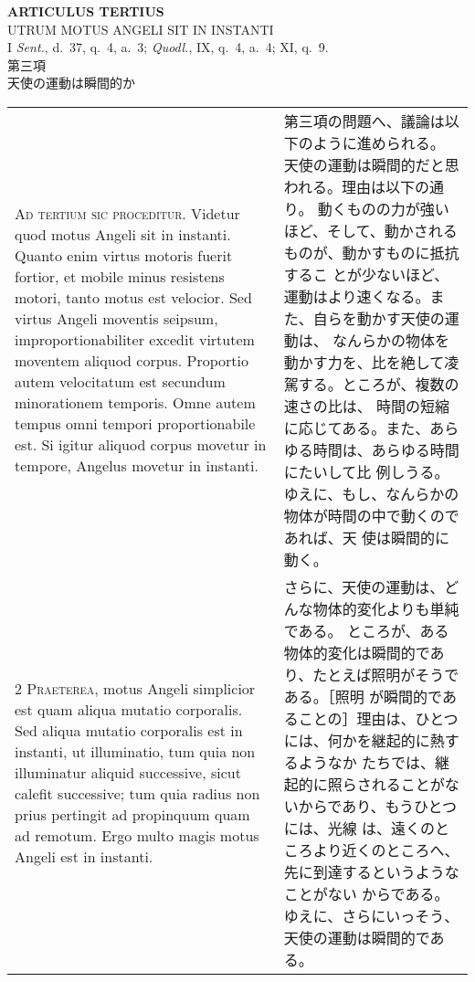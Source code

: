 \documentclass[10pt]{jsarticle} %
\begin{document}
\begin{center}
 {\Large {\bf ARTICULUS TERTIUS}}\\
 {\large UTRUM MOTUS ANGELI SIT IN INSTANTI}\\
 {\footnotesize I {\itshape Sent.}, d.~37, q.~4, a.~3; {\itshape
 Quodl.}, IX, q.~4, a.~4; XI, q.~9.}\\
 {\Large 第三項\\天使の運動は瞬間的か}
\end{center}

\begin{longtable}{p{21em}p{21em}}

{\huge A}{\scshape d tertium sic proceditur}. Videtur quod
motus Angeli sit in instanti. Quanto enim virtus motoris fuerit fortior,
et mobile minus resistens motori, tanto motus est velocior. Sed virtus
Angeli moventis seipsum, improportionabiliter excedit virtutem moventem
aliquod corpus. Proportio autem velocitatum est secundum minorationem
temporis. Omne autem tempus omni tempori proportionabile est. Si igitur
aliquod corpus movetur in tempore, Angelus movetur in instanti.

&


第三項の問題へ、議論は以下のように進められる。
天使の運動は瞬間的だと思われる。理由は以下の通り。
動くものの力が強いほど、そして、動かされるものが、動かすものに抵抗するこ
 とが少ないほど、運動はより速くなる。また、自らを動かす天使の運動は、
 なんらかの物体を動かす力を、比を絶して凌駕する。ところが、複数の速さの比は、
 時間の短縮に応じてある。また、あらゆる時間は、あらゆる時間にたいして比
 例しうる。ゆえに、もし、なんらかの物体が時間の中で動くのであれば、天
 使は瞬間的に動く。

\\


{\scshape 2 Praeterea}, motus Angeli simplicior est quam
aliqua mutatio corporalis. Sed aliqua mutatio corporalis est in
instanti, ut illuminatio, tum quia non illuminatur aliquid successive,
sicut calefit successive; tum quia radius non prius pertingit ad
propinquum quam ad remotum. Ergo multo magis motus Angeli est in
instanti.

&
さらに、天使の運動は、どんな物体的変化よりも単純である。
ところが、ある物体的変化は瞬間的であり、たとえば照明がそうである。［照明
 が瞬間的であることの］理由は、ひとつには、何かを継起的に熱するようなか
 たちでは、継起的に照らされることがないからであり、もうひとつには、光線
 は、遠くのところより近くのところへ、先に到達するというようなことがない
 からである。ゆえに、さらにいっそう、天使の運動は瞬間的である。


\end{longtable}
\end{document}
